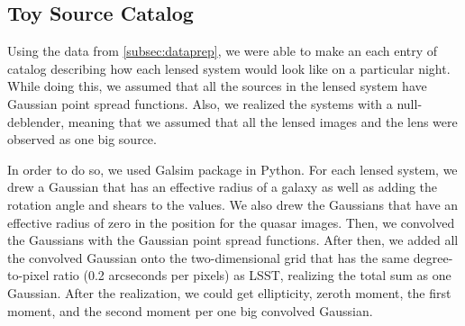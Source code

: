 \documentclass[\docopts]{\docclass}
\begin{document}
\subsection{Toy Source Catalog}

\label{sssec:toysource}

Using the data from \autoref{subsec:dataprep}, we were able to make an
each entry of catalog describing how each lensed system would look like
on a particular night. While doing this, we assumed that all the sources
in the lensed system have Gaussian point spread functions. Also, we
realized the systems with a null-deblender, meaning that we assumed that
all the lensed images and the lens were observed as one big source.

In order to do so, we used Galsim package in Python. For each lensed
system, we drew a Gaussian that has an effective radius of a galaxy as
well as adding the rotation angle and shears to the values. We also drew
the Gaussians that have an effective radius of zero in the position for
the quasar images. Then, we convolved the Gaussians with the Gaussian
point spread functions. After then, we added all the convolved Gaussian
onto the two-dimensional grid that has the same degree-to-pixel ratio
(0.2 arcseconds per pixels) as LSST, realizing the total sum as one
Gaussian. After the realization, we could get ellipticity, zeroth
moment, the first moment, and the second moment per one big convolved
Gaussian.
\end{document}
